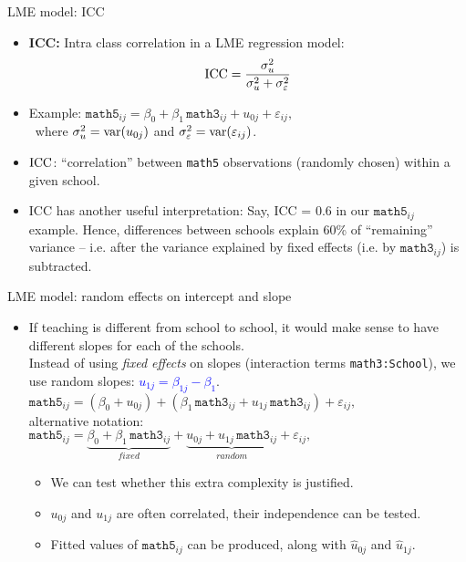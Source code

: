\documentclass{beamer}
\begin{document}
\begin{frame}{LME model: ICC}
\small
\begin{itemize}
\item \textbf{ICC:} Intra class correlation in a LME regression model: \qquad
$$ \textnormal{ICC}=\frac{\sigma^2_u}{\sigma^2_u + \sigma^2_{\varepsilon}} $$
\medskip
\item Example: \qquad $\texttt{math5}_{ij} = \beta_{0} + \beta_1 \, \texttt{math3}_{ij} + u_{0j} + \varepsilon_{ij},$\\ \medskip
\qquad \qquad \qquad ~where $\sigma^2_u = \textnormal{var}(u_{0j})$ and $\sigma^2_{\varepsilon} = \textnormal{var}(\varepsilon_{ij})$.\\ \smallskip
\medskip
\item $\textnormal{ICC}$: ``correlation'' between \texttt{math5}  observations (randomly chosen) within a given school.
\bigskip 
\item ICC has another useful interpretation: Say, ICC = 0.6 in our $\texttt{math5}_{ij}$ example. Hence, differences between schools explain 60\% of ``remaining'' variance -- i.e. after the variance explained by fixed effects (i.e. by $\texttt{math3}_{ij}$) is subtracted.
\end{itemize}
\end{frame}
\begin{frame}{LME model: random effects on intercept and slope}
\small
\begin{itemize}
\item If teaching is different from school to school, it would make
sense to have different slopes for each of the schools.\\
\medskip
Instead of using \textit{fixed effects} on slopes (interaction terms \texttt{math3:School}), we use random slopes: \textcolor{blue}{$ u_{1j} = \beta_{1j} - \beta_1 $}. \\
\bigskip
$ \texttt{math5}_{ij} = \left( \beta_{0} + u_{0j} \right) + \left( \beta_1\, \texttt{math3}_{ij}  + u_{1j} \, \texttt{math3}_{ij}  \right) + \varepsilon_{ij}, $ \\
\medskip
alternative notation:\\
\medskip
$\texttt{math5}_{ij} = \underbrace{\beta_{0} + \beta_1 \,  \texttt{math3}_{ij}}_{\textit{fixed}}
+ \underbrace{u_{0j} + u_{1j} \, \texttt{math3}_{ij}}_{\textit{random}} 
+ \varepsilon_{ij}, $ \\
\bigskip
\begin{itemize}
\item We can test whether this extra complexity is justified.
\smallskip
\item ${u}_{0j}$ and ${u}_{1j}$ are often correlated, their independence can be tested.
\smallskip
\item Fitted values of $\texttt{math5}_{ij}$ can be produced, along with $\hat{u}_{0j}$ and $\hat{u}_{1j}$.
\end{itemize}
\end{itemize}
\end{frame}
\end{document}

